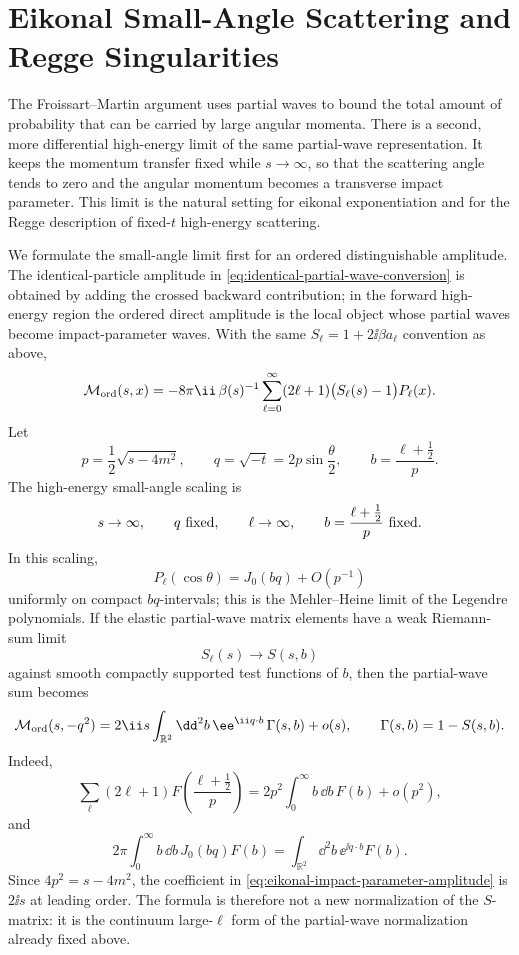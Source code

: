 \section{Eikonal Small-Angle Scattering and Regge Singularities}
\label{sec:eikonal-regge-small-angle}

The Froissart--Martin argument uses partial waves to bound the total amount of
probability that can be carried by large angular momenta.  There is a second,
more differential high-energy limit of the same partial-wave representation.
It keeps the momentum transfer fixed while \(s\to\infty\), so that the
scattering angle tends to zero and the angular momentum becomes a transverse
impact parameter.  This limit is the natural setting for eikonal
exponentiation and for the Regge description of fixed-\(t\) high-energy
scattering.

We formulate the small-angle limit first for an ordered distinguishable
amplitude.  The identical-particle amplitude in
\eqref{eq:identical-partial-wave-conversion} is obtained by adding the crossed
backward contribution; in the forward high-energy region the ordered direct
amplitude is the local object whose partial waves become impact-parameter
waves.  With the same \(S_\ell=1+2\ii\beta a_\ell\) convention as above,
\[
  \mathcal M_{\rm ord}(s,x)
  =
  -8\pi\ii\,\beta(s)^{-1}
  \sum_{\ell=0}^{\infty}(2\ell+1)
  \bigl(S_\ell(s)-1\bigr)P_\ell(x).
\]
Let
\[
  p=\frac12\sqrt{s-4m^2},
  \qquad
  q=\sqrt{-t}=2p\sin\frac{\theta}{2},
  \qquad
  b=\frac{\ell+\frac12}{p}.
\]
The high-energy small-angle scaling is
\[
  s\to\infty,\qquad q\ \hbox{fixed},\qquad \ell\to\infty,
  \qquad b=\frac{\ell+\frac12}{p}\ \hbox{fixed}.
\]
In this scaling,
\[
  P_\ell(\cos\theta)
  =
  J_0(bq)+O(p^{-1})
\]
uniformly on compact \(bq\)-intervals; this is the Mehler--Heine limit of the
Legendre polynomials.  If the elastic partial-wave matrix elements have a
weak Riemann-sum limit
\[
  S_\ell(s)\longrightarrow S(s,b)
\]
against smooth compactly supported test functions of \(b\), then the
partial-wave sum becomes
\begin{equation}
  \mathcal M_{\rm ord}(s,-q^2)
  =
  2\ii s\int_{\mathbb R^2}\dd^2b\,
  \ee^{\ii q\cdot b}\,
  \Gamma(s,b)
  +o(s),
  \qquad
  \Gamma(s,b)=1-S(s,b).
  \label{eq:eikonal-impact-parameter-amplitude}
\end{equation}
Indeed,
\[
  \sum_\ell(2\ell+1)F\!\left(\frac{\ell+\frac12}{p}\right)
  =
  2p^2\int_0^\infty b\,\dd b\,F(b)+o(p^2),
\]
and
\[
  2\pi\int_0^\infty b\,\dd b\,J_0(bq)F(b)
  =
  \int_{\mathbb R^2}\dd^2b\,\ee^{\ii q\cdot b}F(b).
\]
Since \(4p^2=s-4m^2\), the coefficient in
\eqref{eq:eikonal-impact-parameter-amplitude} is \(2\ii s\) at leading
order.  The formula is therefore not a new normalization of the \(S\)-matrix:
it is the continuum large-\(\ell\) form of the partial-wave normalization
already fixed above.

